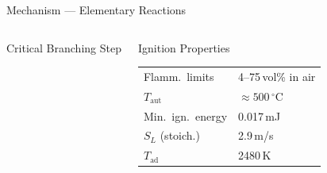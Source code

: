 \documentclass[aspectratio=169,10pt]{beamer}
\begin{document}
\begin{frame}{ Mechanism --- Elementary Reactions}
\begin{columns}[t]
\begin{alertblock}{Critical Branching Step}
    \end{alertblock}
    \begin{block}{Ignition Properties}
      \footnotesize
      \begin{tabular}{@{}ll@{}}
        Flamm.\ limits & 4--75\,vol\% in air \\
        $T_\text{aut}$  & $\approx500\,^{\circ}$C \\
        Min.\ ign.\ energy & 0.017\,mJ \\
        $S_L$ (stoich.) & 2.9\,m/s \\
        $T_\text{ad}$   & 2480\,K \\
      \end{tabular}
    \end{block}
  \end{columns}
\end{frame}
\end{document}
